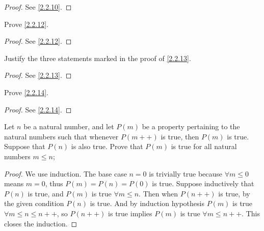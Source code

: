 \begin{proof}
  See \cref{2.2.10}.
\end{proof}

\begin{exercise}\label{ex 2.2.3}
  Prove \cref{2.2.12}.
\end{exercise}

\begin{proof}
  See \cref{2.2.12}.
\end{proof}

\begin{exercise}\label{ex 2.2.4}
  Justify the three statements marked in the proof of \cref{2.2.13}.
\end{exercise}

\begin{proof}
  See \cref{2.2.13}.
\end{proof}

\begin{exercise}\label{ex 2.2.5}
  Prove \cref{2.2.14}.
\end{exercise}

\begin{proof}
  See \cref{2.2.14}.
\end{proof}

\begin{exercise}\label{ex 2.2.6}
  Let \(n\) be a natural number, and let \(P(m)\) be a property pertaining to the natural numbers such that whenever \(P(m++)\) is true, then \(P(m)\) is true.
  Suppose that \(P(n)\) is also true.
  Prove that \(P(m)\) is true for all natural numbers \(m \leq n\);
\end{exercise}

\begin{proof}
  We use induction.
  The base case \(n = 0\) is trivially true because \(\forall m \leq 0\) means \(m = 0\), thus \(P(m) = P(n) = P(0)\) is true.
  Suppose inductively that \(P(n)\) is true, and \(P(m)\) is true \(\forall m \leq n\).
  Then when \(P(n++)\) is true, by the given condition \(P(n)\) is true.
  And by induction hypothesis \(P(m)\) is true \(\forall m \leq n \leq n++\), so \(P(n++)\) is true implies \(P(m)\) is true \(\forall m \leq n++\).
  This closes the induction.
\end{proof}